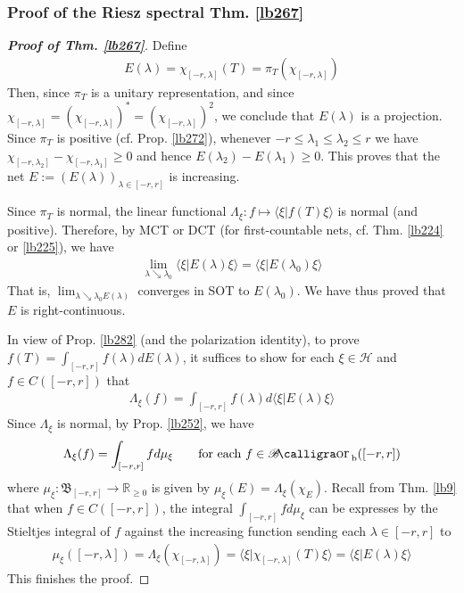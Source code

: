 \documentclass[12pt,b5paper,notitlepage]{article}
\theoremstyle{definition}
\theoremstyle{plain}
\DeclareMathOperator{\Borb}{{\mathscr{B}\text{\kern -2pt {\calligra\large or}}\,}_{\mathrm b}}
\newcommand{\fk}{\mathfrak}
\newcommand{\bk}[1]{\langle {#1}\rangle}
\newcommand{\Rbb}{\mathbb R}
\newcommand{\MH}{\mathcal H}
\numberwithin{equation}{section}
\begin{document}
\subsubsection{Proof of the Riesz spectral Thm. \ref{lb267}}\label{lb289}


\begin{proof}[\textbf{Proof of Thm. \ref{lb267}}]
Define
\begin{align*}
E(\lambda)=\chi_{[-r,\lambda]}(T)=\pi_T(\chi_{[-r,\lambda]})
\end{align*}
Then, since $\pi_T$ is a unitary representation, and since $\chi_{[-r,\lambda]}=(\chi_{[-r,\lambda]})^*=(\chi_{[-r,\lambda]})^2$, we conclude that $E(\lambda)$ is a projection. Since $\pi_T$ is positive (cf. Prop. \ref{lb272}), whenever $-r\leq\lambda_1\leq\lambda_2\leq r$ we have $\chi_{[-r,\lambda_2]}-\chi_{[-r,\lambda_1]}\geq0$ and hence $E(\lambda_2)-E(\lambda_1)\geq0$. This proves that the net $E:=(E(\lambda))_{\lambda\in[-r,r]}$ is increasing. 

Since $\pi_T$ is normal, the linear functional $\Lambda_\xi:f\mapsto\bk{\xi|f(T)\xi}$ is normal (and positive). Therefore, by MCT or DCT (for first-countable nets, cf. Thm. \ref{lb224} or \ref{lb225}), we have
\begin{align*}
\lim_{\lambda\searrow\lambda_0}\bk{\xi|E(\lambda)\xi}=\bk{\xi|E(\lambda_0)\xi}
\end{align*}
That is, $\lim_{\lambda\searrow\lambda_0 E(\lambda)}$ converges in SOT to $E(\lambda_0)$. We have thus proved that $E$ is right-continuous.


In view of Prop. \ref{lb282} (and the polarization identity), to prove $f(T)=\int_{[-r,r]}f(\lambda)dE(\lambda)$, it suffices to show for each $\xi\in\MH$ and $f\in C([-r,r])$ that
\begin{align*}
\Lambda_\xi(f)=\int_{[-r,r]}f(\lambda)d\bk{\xi|E(\lambda)\xi}
\end{align*}
Since $\Lambda_\xi$ is normal, by Prop. \ref{lb252}, we have
\begin{align*}
\Lambda_\xi(f)=\int_{[-r,r]}fd\mu_\xi\qquad\text{for each }f\in\Borb([-r,r])
\end{align*}
where $\mu_\xi:\fk B_{[-r,r]}\rightarrow\Rbb_{\geq0}$ is given by $\mu_\xi(E)=\Lambda_\xi(\chi_E)$. Recall from Thm. \ref{lb9} that when $f\in C([-r,r])$, the integral $\int_{[-r,r]}fd\mu_\xi$ can be expresses by the Stieltjes integral of $f$ against the increasing function sending each $\lambda\in[-r,r]$ to
\begin{align*}
\mu_\xi([-r,\lambda])=\Lambda_\xi(\chi_{[-r,\lambda]})=\bk{\xi|\chi_{[-r,\lambda]}(T)\xi}=\bk{\xi|E(\lambda)\xi}
\end{align*}
This finishes the proof.
\end{proof}
\end{document}
